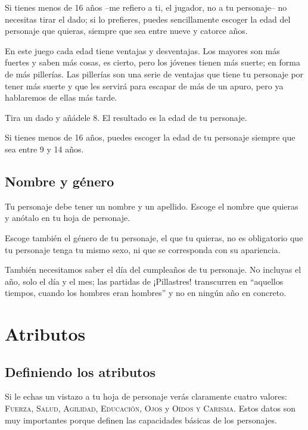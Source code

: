 Si tienes menos de 16 años --me refiero a ti, el jugador, no a tu personaje-- no necesitas tirar el dado; si lo prefieres, puedes sencillamente escoger la edad del personaje que quieras, siempre que sea entre nueve y catorce años.

En este juego cada edad tiene ventajas y desventajas. Los mayores son más fuertes y saben más cosas, es cierto, pero los jóvenes tienen más suerte; en forma de más pillerías. Las pillerías son una serie de ventajas que tiene tu personaje por tener más suerte y que les servirá para escapar de más de un apuro, pero ya hablaremos de ellas más tarde.


Tira un dado y añádele 8. El resultado es la edad de tu personaje.

Si tienes menos de 16 años, puedes escoger la edad de tu personaje siempre que sea entre 9 y 14 años.

\subsection*{Nombre y género}

Tu personaje debe tener un nombre y un apellido. Escoge el nombre que quieras y anótalo en tu hoja de personaje. 

Escoge también el género de tu personaje, el que tu quieras, no es obligatorio que tu personaje tenga tu mismo sexo, ni que se corresponda con su apariencia.

También necesitamos saber el día del cumpleaños de tu personaje. No incluyas el año, solo el día y el mes; las partidas de ¡Pillastres! transcurren en “aquellos tiempos, cuando los hombres eran hombres” y no en ningún año en concreto.

\section{Atributos}

\subsection{Definiendo los atributos}

Si le echas un vistazo a tu hoja de personaje verás claramente cuatro valores: \textsc{Fuerza, Salud, Agilidad, Educación, Ojos} y \textsc{Oídos y Carisma}. Estos datos son muy importantes porque definen las capacidades básicas de los personajes.

